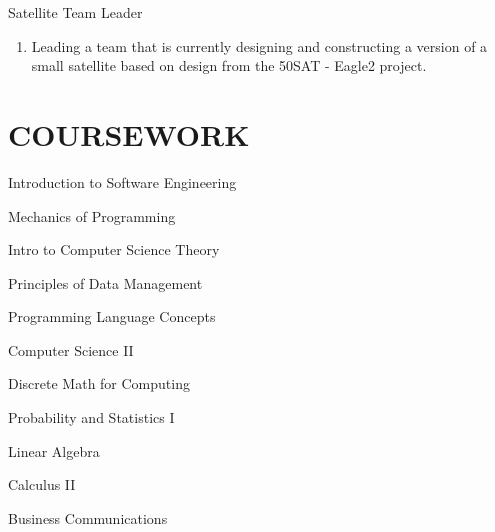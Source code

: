\documentclass[line, margin]{res}
\begin{document}
\begin{resume}
 Satellite Team Leader
      \begin{enumerate}[series=MyList, label=\textbullet]
        \item Leading a team that is currently designing and constructing a version of a small satellite based on design from the \textdollar 50SAT - Eagle2 project.
      \end{enumerate}

\section{COURSEWORK}


      \begin{enumerate*}[series=MyList, before=\hspace{-0.6ex}, label=\textbullet]
        \item Introduction to Software Engineering
        \item Mechanics of Programming
        \item Intro to Computer Science Theory
        \item Principles of Data Management
        \item Programming Language Concepts
        \item Computer Science II
        \item Discrete Math for Computing
        \item Probability and Statistics I
        \item Linear Algebra
        \item Calculus II
        \item Business Communications
      \end{enumerate*}


 
\end{resume}
\end{document}
